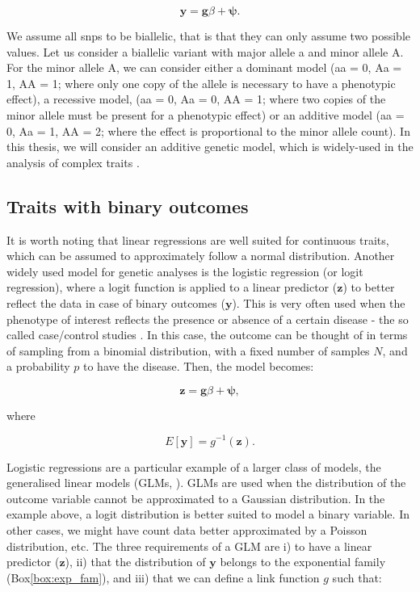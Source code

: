 \begin{equation}\label{eq:Linear_regression_genetics}
 \mathbf{y} = \mathbf{g}\beta + \boldsymbol{\psi}. 
\end{equation}

We assume all \gls{snp}s to be biallelic, that is that they can only assume two possible values. 
Let us consider a biallelic variant with major allele a and minor allele A. For the minor allele A, we can consider either a dominant model (aa = 0, Aa = 1, AA = 1; where only one copy of the allele is necessary to have a phenotypic effect), a recessive model, (aa = 0, Aa = 0, AA = 1; where two copies of the minor allele must be present for a phenotypic effect) or an additive model (aa = 0, Aa = 1, AA = 2; where the effect is proportional to the minor allele count). 
In this thesis, we will consider an additive genetic model, which is widely-used in the analysis of complex traits \cite{laird2010fundamentals}.

\subsection{Traits with binary outcomes}

It is worth noting that linear regressions are well suited for continuous traits, which can be assumed to approximately follow a normal distribution. 
Another widely used model for genetic analyses is the logistic regression (or logit regression), where a logit function is applied to a linear predictor ($\mathbf{z}$) to better reflect the data in case of binary outcomes ($\mathbf{y}$). 
This is very often used when the phenotype of interest reflects the presence or absence of a certain disease - the so called case/control studies \cite{chen2001general,clayton2013statistical}.
In this case, the outcome can be thought of in terms of sampling from a binomial distribution, with a fixed number of samples $N$, and a probability $p$ to have the disease. 
Then, the model becomes:

\begin{equation}\label{eq:Logistic_regression_genetics_z}
 \mathbf{z} = \mathbf{g}\beta + \boldsymbol{\psi}, 
\end{equation}

where 

\begin{equation}
    E[\mathbf{y}] = g^{-1}(\mathbf{z}).
\end{equation}

Logistic regressions are a particular example of a larger class of models, the generalised linear models (GLMs, \cite{mccullagh2018generalized}). 
GLMs are used when the distribution of the outcome variable cannot be approximated to a Gaussian distribution. 
In the example above, a logit distribution is better suited to model a binary variable. 
In other cases, we might have count data better approximated by a Poisson distribution, etc.
The three requirements of a GLM are i) to have a linear predictor ($\mathbf{z}$), ii) that the distribution of $\mathbf{y}$  belongs to the exponential family (Box\ref{box:exp_fam}), and iii) that we can define a link function $g$ such that:


